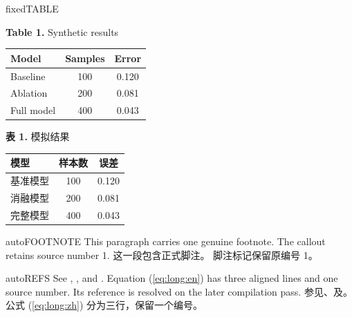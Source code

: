 \begin{demopair}{fixed}{TABLE}
\hypertarget{table:1:en}{}\noindent\begin{minipage}{\linewidth}\centering
\textbf{Table 1.} Synthetic results\par\medskip
\begin{tabular}{@{}lcc@{}}\toprule Model & Samples & Error\\\midrule Baseline & 100 & 0.120\\ Ablation & 200 & 0.081\\ Full model & 400 & 0.043\\\bottomrule\end{tabular}\par
\end{minipage}
\switchcolumn
\hypertarget{table:1:zh}{}\noindent\begin{minipage}{\linewidth}\centering
\textbf{表 1.} 模拟结果\par\medskip
\begin{tabular}{@{}lcc@{}}\toprule 模型 & 样本数 & 误差\\\midrule 基准模型 & 100 & 0.120\\ 消融模型 & 200 & 0.081\\ 完整模型 & 400 & 0.043\\\bottomrule\end{tabular}\par
\end{minipage}
\end{demopair}
\begin{demopair}{auto}{FOOTNOTE}
\ENIndent\noindent\ProbeOnce{}\label{fn:block:en}This paragraph carries one genuine footnote. The callout retains source number 1.
\switchcolumn
\ZHIndent\ProbeOnce{}\label{fn:block:zh}这一段包含正式脚注。 脚注标记保留原编号 1。
\end{demopair}
\clearpage
{}
\begin{demopair}{auto}{REFS}
\ENIndent\noindent See , , and . Equation (\hyperref[eq:long:en]{\ref*{eq:long:en}}) has three aligned lines and one source number. Its reference is resolved on the later compilation pass.
\switchcolumn
\ZHIndent 参见、及。公式 (\hyperref[eq:long:zh]{\ref*{eq:long:zh}}) 分为三行，保留一个编号。
\end{demopair}
